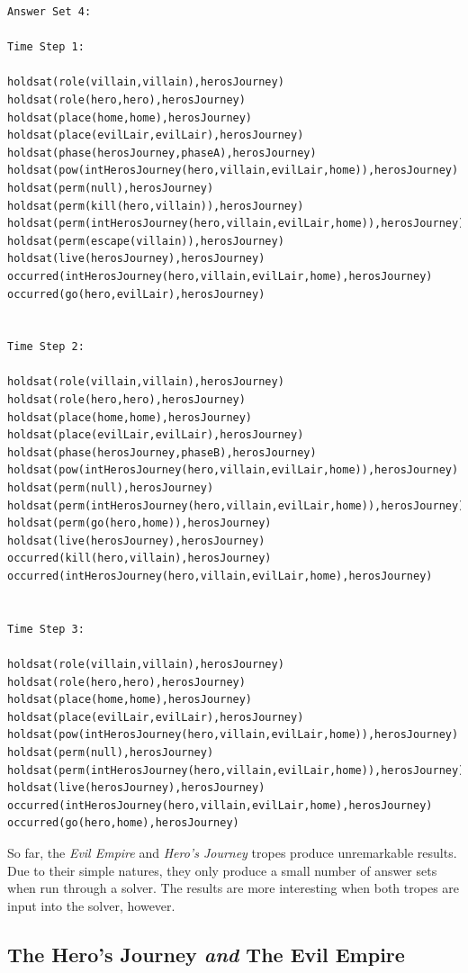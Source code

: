 \documentclass[11pt]{report}
\begin{document}
\begin{lstlisting}[label={lst:hero-trace},caption={Example trace for the
``Hero's Journey'' trope}]
Answer Set 4:

Time Step 1:

holdsat(role(villain,villain),herosJourney)
holdsat(role(hero,hero),herosJourney)
holdsat(place(home,home),herosJourney)
holdsat(place(evilLair,evilLair),herosJourney)
holdsat(phase(herosJourney,phaseA),herosJourney)
holdsat(pow(intHerosJourney(hero,villain,evilLair,home)),herosJourney)
holdsat(perm(null),herosJourney)
holdsat(perm(kill(hero,villain)),herosJourney)
holdsat(perm(intHerosJourney(hero,villain,evilLair,home)),herosJourney)
holdsat(perm(escape(villain)),herosJourney)
holdsat(live(herosJourney),herosJourney)
occurred(intHerosJourney(hero,villain,evilLair,home),herosJourney)
occurred(go(hero,evilLair),herosJourney)


Time Step 2:

holdsat(role(villain,villain),herosJourney)
holdsat(role(hero,hero),herosJourney)
holdsat(place(home,home),herosJourney)
holdsat(place(evilLair,evilLair),herosJourney)
holdsat(phase(herosJourney,phaseB),herosJourney)
holdsat(pow(intHerosJourney(hero,villain,evilLair,home)),herosJourney)
holdsat(perm(null),herosJourney)
holdsat(perm(intHerosJourney(hero,villain,evilLair,home)),herosJourney)
holdsat(perm(go(hero,home)),herosJourney)
holdsat(live(herosJourney),herosJourney)
occurred(kill(hero,villain),herosJourney)
occurred(intHerosJourney(hero,villain,evilLair,home),herosJourney)


Time Step 3:

holdsat(role(villain,villain),herosJourney)
holdsat(role(hero,hero),herosJourney)
holdsat(place(home,home),herosJourney)
holdsat(place(evilLair,evilLair),herosJourney)
holdsat(pow(intHerosJourney(hero,villain,evilLair,home)),herosJourney)
holdsat(perm(null),herosJourney)
holdsat(perm(intHerosJourney(hero,villain,evilLair,home)),herosJourney)
holdsat(live(herosJourney),herosJourney)
occurred(intHerosJourney(hero,villain,evilLair,home),herosJourney)
occurred(go(hero,home),herosJourney)
\end{lstlisting}

So far, the \emph{Evil Empire} and \emph{Hero's Journey} tropes produce
unremarkable results. Due to their simple natures, they only produce a small
number of answer sets when run through a solver. The results are more
interesting when both tropes are input into the solver, however.

\subsection{The Hero's Journey \emph{and} The Evil Empire}
\end{document}
